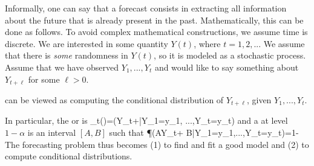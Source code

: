 Informally, one can say that a forecast consists in
extracting all information about the future that is
already present in the past. Mathematically, this can
be done as follows. To avoid complex mathematical
constructions, we assume time is discrete.  We are
interested in some quantity $Y(t)$, where $t=1,2,..$.
We assume that there is \emph{some} randomness in
$Y(t)$, so it is modeled as a stochastic process.
Assume that we have observed $Y_1,...,Y_t$ and would
like to say something about $Y_{t+\ell}$ for some
$\ell
>0$.

 can be viewed as computing the
conditional distribution of $Y_{t+\ell}$, given
$Y_1,...,Y_t$.

In particular, the  or
 is
 \ben
 _t(\ell)=\E(Y_{t+\ell}|Y_1=y_1, ...,Y_t=y_t)
 \een
and a  at level $1-\alpha$ is
an interval $[A,B]$ such that
 \ben
 \P\left(A\leq Y_{t+\ell}\leq
B|Y_1=y_1,...,Y_t=y_t\right)=1-\alpha \een
 The
forecasting problem thus becomes (1) to find and fit a
good model and (2) to compute conditional
distributions.

